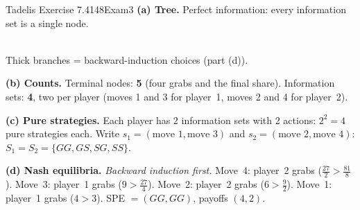 \begin{exsol}{Tadelis Exercise 7.4}{148}{Exam}{3}
\textbf{(a) Tree.} Perfect information: every information set is a single node.
\begin{center}
\\[2pt]
{\footnotesize Thick branches = backward-induction choices (part (d)).}
\end{center}

\textbf{(b) Counts.} Terminal nodes: \textbf{5} (four grabs and the final share). Information sets:
\textbf{4}, two per player (moves 1 and 3 for player~1, moves 2 and 4 for player~2).

\textbf{(c) Pure strategies.} Each player has 2 information sets with 2 actions: $2^2 = 4$ pure
strategies each. Write $s_1 = (\text{move 1}, \text{move 3})$ and $s_2 = (\text{move 2},
\text{move 4})$: $S_1 = S_2 = \{GG, GS, SG, SS\}$.

\textbf{(d) Nash equilibria.} \emph{Backward induction first.} Move~4: player~2 grabs
($\frac{27}{2} > \frac{81}{8}$). Move~3: player~1 grabs ($9 > \frac{27}{4}$). Move~2: player~2
grabs ($6 > \frac92$). Move~1: player~1 grabs ($4 > 3$). SPE $= (GG, GG)$, payoffs $(4, 2)$.


\end{exsol}
